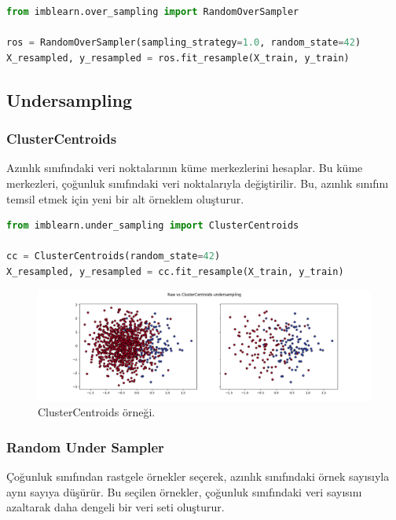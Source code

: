 \begin{lstlisting}[language=Python]
from imblearn.over_sampling import RandomOverSampler

ros = RandomOverSampler(sampling_strategy=1.0, random_state=42)
X_resampled, y_resampled = ros.fit_resample(X_train, y_train)
\end{lstlisting}

\newpage

\subsection{Undersampling}

\subsubsection{ClusterCentroids}
Azınlık sınıfındaki veri noktalarının küme merkezlerini hesaplar. Bu küme merkezleri, çoğunluk sınıfındaki veri noktalarıyla değiştirilir. Bu, azınlık sınıfını temsil etmek için yeni bir alt örneklem oluşturur.

\begin{lstlisting}[language=Python]
from imblearn.under_sampling import ClusterCentroids

cc = ClusterCentroids(random_state=42)
X_resampled, y_resampled = cc.fit_resample(X_train, y_train)
\end{lstlisting}

\begin{figure}[h]
    \centering
    \includegraphics[width=1\textwidth]{images/Raw vs ClusterCentroids undersampling.png}
    \caption{ClusterCentroids örneği.}
    \label{fig:enter-label}
\end{figure}

\newpage

\subsubsection{Random Under Sampler}
Çoğunluk sınıfından rastgele örnekler seçerek, azınlık sınıfındaki örnek sayısıyla aynı sayıya düşürür. Bu seçilen örnekler, çoğunluk sınıfındaki veri sayısını azaltarak daha dengeli bir veri seti oluşturur.

